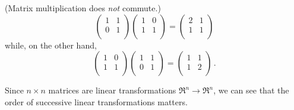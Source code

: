 \begin{example} (Matrix multiplication does \emph{not} commute.)
\[
\begin{pmatrix}
1 & 1 \\
0 & 1 \\
\end{pmatrix}
\begin{pmatrix}
1 & 0 \\
1 & 1 \\
\end{pmatrix} =
\begin{pmatrix}
2 & 1 \\
1 & 1 \\
\end{pmatrix}
\]
while, on the other hand,
\[
\begin{pmatrix}
1 & 0 \\
1 & 1 \\
\end{pmatrix}
\begin{pmatrix}
1 & 1 \\
0 & 1 \\
\end{pmatrix} =
\begin{pmatrix}
1 & 1 \\
1 & 2 \\
\end{pmatrix}\, .
\]
\end{example}
Since $n\times n$ matrices are linear transformations $\Re^n \rightarrow \Re^n$, we can see that the order of successive linear transformations matters.  

